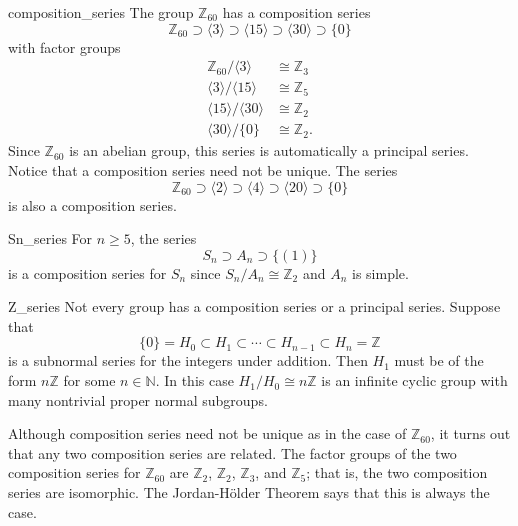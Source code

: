 \begin{example}{composition_series}
The group ${\mathbb Z}_{60}$ has  a composition series 
\[
{\mathbb Z}_{60} \supset \langle 3 \rangle \supset  \langle 15 \rangle
\supset \langle 30 \rangle  \supset \{ 0 \}
\]
with factor groups
\begin{align*}
{\mathbb Z}_{60} / \langle 3 \rangle & \cong  {\mathbb Z}_{3} \\
\langle 3 \rangle / \langle 15 \rangle & \cong  {\mathbb Z}_{5} \\
\langle 15 \rangle / \langle 30 \rangle & \cong  {\mathbb Z}_{2} \\
\langle 30 \rangle / \{ 0 \} & \cong  {\mathbb Z}_2.
\end{align*}
Since ${\mathbb Z}_{60}$ is an abelian group, this series is
automatically a principal series. Notice that a composition series
need not be unique.  The series 
\[
{\mathbb Z}_{60} \supset \langle 2 \rangle \supset \langle 4 \rangle 
\supset  \langle 20 \rangle \supset \{ 0 \}
\]
is also a composition series.
\end{example}
 
 
 
\begin{example}{Sn_series}
For $n \geq 5$, the series
\[
S_n \supset A_n \supset \{ (1) \}
\]
is a composition series for $S_n$ since $S_n / A_n \cong {\mathbb Z}_2$
and $A_n$ is simple.
\end{example}
 
 
 
\begin{example}{Z_series}
Not every group has a composition series or a principal series.
Suppose that 
\[
\{ 0 \} = H_0 \subset H_1 \subset \cdots \subset H_{n-1}
\subset H_n = {\mathbb Z}
\]
is a subnormal series for the integers under addition. Then $H_1$ must
be of the form $n {\mathbb Z}$ for some $n \in {\mathbb N}$. In this case
$H_1 / H_0 \cong n {\mathbb Z}$ is an infinite cyclic group with many
nontrivial proper normal subgroups. 
\end{example}
 
 
 
Although composition series need not be unique as in the case of
${\mathbb Z}_{60}$, it turns out that any two composition series are
related. The factor groups of the two composition series for ${\mathbb 
Z}_{60}$ are ${\mathbb Z}_2$,  ${\mathbb Z}_2$,  ${\mathbb Z}_3$, and  ${\mathbb
Z}_5$; that is,  the two composition series are isomorphic. The
Jordan-H\"{o}lder Theorem says that this is always the case.
 
